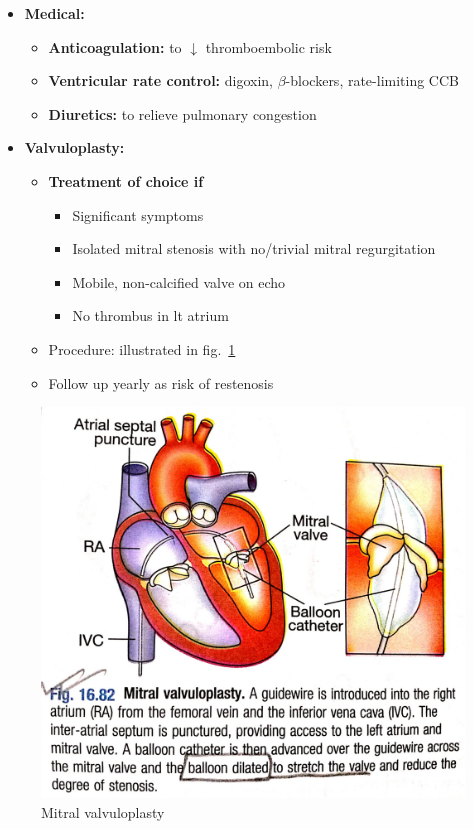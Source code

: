 \documentclass[
  12pt,
]{memoir}
\providecommand{\tightlist}{%
  \setlength{\itemsep}{0pt}\setlength{\parskip}{0pt}}
\begin{document}
\begin{itemize}
\tightlist
\item
  \textbf{Medical:}

  \begin{itemize}
  \tightlist
  \item
    \textbf{Anticoagulation:} to \(\downarrow\) thromboembolic risk
  \item
    \textbf{Ventricular rate control:} digoxin, \(\beta\)-blockers,
    rate-limiting CCB
  \item
    \textbf{Diuretics:} to relieve pulmonary congestion
  \end{itemize}
\item
  \textbf{Valvuloplasty:}

  \begin{itemize}
  \tightlist
  \item
    \textbf{Treatment of choice if}

    \begin{itemize}
    \tightlist
    \item
      Significant symptoms
    \item
      Isolated mitral stenosis with no/trivial mitral regurgitation
    \item
      Mobile, non-calcified valve on echo
    \item
      No thrombus in lt atrium
    \end{itemize}
  \item
    Procedure: illustrated in fig.~\ref{fig:valvuloplasty}
  \item
    Follow up yearly as risk of restenosis
  \end{itemize}
\end{itemize}

\begin{figure}[!h]
    \centering
    \includegraphics[width=.5\textwidth]{../assets/med/valvuloplasty.jpg}
    \vspace{5mm}
    \caption{Mitral valvuloplasty}
    \label{fig:valvuloplasty}
\end{figure}
\end{document}
